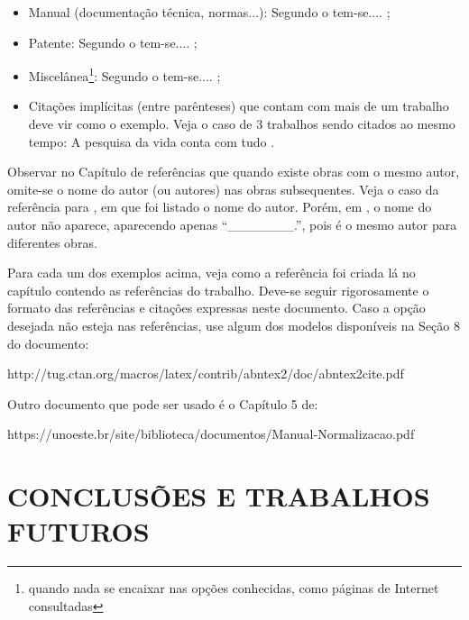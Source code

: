 \documentclass{templateppgmo}
\numberwithin{figure}{chapter}
\numberwithin{table}{chapter}
\numberwithin{quadro}{chapter}
\numberwithin{algoritmo}{chapter}
\numberwithin{codigo}{chapter}
\begin{document}
\begin{itemize}
  	\item Manual (documentação técnica, normas...): Segundo o  tem-se.... \cite{NBR6023:2000};

  	\item Patente: Segundo o  tem-se.... \cite{cruvinel1989};

  	\item Miscelânea\footnote{quando nada se encaixar nas opções conhecidas, como páginas de Internet consultadas}: Segundo o  tem-se.... \cite{araujo:2015:classe_abnt2};

  	\item Citações implícitas (entre parênteses) que contam com mais de um trabalho deve vir como o exemplo. Veja o caso de 3 trabalhos sendo citados ao mesmo tempo: A pesquisa da vida conta com tudo \cite{silva:incollection,silva:artigo, cruvinel1989}.

  	\end{itemize}

  	Observar no Capítulo de referências que quando existe obras com o mesmo autor, omite-se o nome do autor (ou autores) nas obras subsequentes. Veja o caso da referência para , em que foi listado o nome do autor. Porém, em , o nome do autor não aparece, aparecendo apenas ``\_\_\_\_\_\_\_.'', pois é o mesmo autor para diferentes obras.

  	Para cada um dos exemplos acima, veja como a referência foi criada lá no capítulo contendo as referências do trabalho. Deve-se seguir rigorosamente o formato das referências e citações expressas neste documento. Caso a opção desejada não esteja nas referências, use algum dos modelos disponíveis na Seção 8 do documento:

  	http://tug.ctan.org/macros/latex/contrib/abntex2/doc/abntex2cite.pdf

  	Outro documento que pode ser usado é o Capítulo 5 de:

  	https://unoeste.br/site/biblioteca/documentos/Manual-Normalizacao.pdf


  	\chapter{CONCLUSÕES E TRABALHOS FUTUROS}
\end{document}
